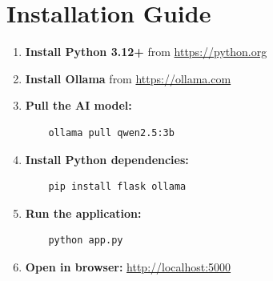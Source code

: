 \documentclass[12pt,a4paper]{report}
\begin{document}
\chapter{Installation Guide}

\begin{enumerate}
    \item \textbf{Install Python 3.12+} from \url{https://python.org}
    \item \textbf{Install Ollama} from \url{https://ollama.com}
    \item \textbf{Pull the AI model:}
    \begin{verbatim}
    ollama pull qwen2.5:3b
    \end{verbatim}
    \item \textbf{Install Python dependencies:}
    \begin{verbatim}
    pip install flask ollama
    \end{verbatim}
    \item \textbf{Run the application:}
    \begin{verbatim}
    python app.py
    \end{verbatim}
    \item \textbf{Open in browser:} \url{http://localhost:5000}
\end{enumerate}
\end{document}

